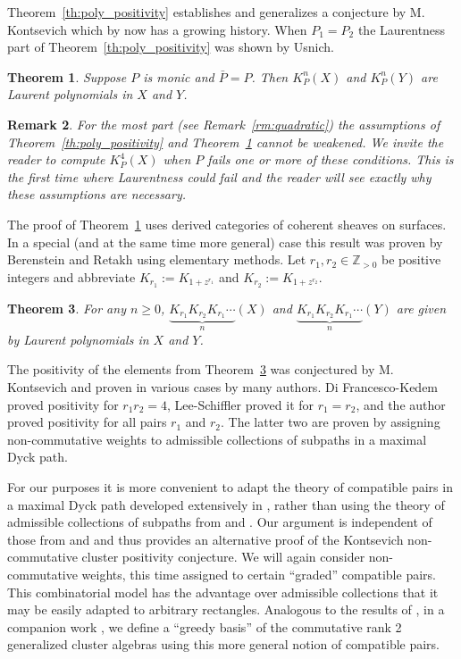 \documentclass{amsart}
\newtheorem{theorem}{Theorem}[section]
\newtheorem{remark}[theorem]{Remark}
\newcommand{\ZZ}{\mathbb{Z}}
\begin{document}
 Theorem~\ref{th:poly_positivity} establishes and generalizes a conjecture by M. Kontsevich which by now has a growing history.  When $P_1=P_2$ the Laurentness part of Theorem~\ref{th:poly_positivity} was shown by Usnich. 
 \begin{theorem}\cite{u}\label{th:laurent}
  Suppose $P$ is monic and $\bar{P}=P$.  Then $K_P^n(X)$ and $K_P^n(Y)$ are Laurent polynomials in $X$ and $Y$.
 \end{theorem}
 \begin{remark}
  For the most part (see Remark~\ref{rm:quadratic}) the assumptions of Theorem~\ref{th:poly_positivity} and Theorem~\ref{th:laurent} cannot be weakened.  We invite the reader to compute $K_P^4(X)$ when $P$ fails one or more of these conditions.  This is the first time where Laurentness could fail and the reader will see exactly why these assumptions are necessary. 
 \end{remark}
 The proof of Theorem~\ref{th:laurent} uses derived categories of coherent sheaves on surfaces.  In a special (and at the same time more general) case this result was proven by Berenstein and Retakh using elementary methods.  Let $r_1,r_2\in\ZZ_{>0}$ be positive integers and abbreviate $K_{r_1}:=K_{1+z^{r_1}}$ and $K_{r_2}:=K_{1+z^{r_2}}$.
 \begin{theorem}\cite{br}\label{th:easy_laurent}
  For any $n\ge0$, $\underbrace{K_{r_1}K_{r_2}K_{r_1}\cdots}_n(X)$ and $\underbrace{K_{r_1}K_{r_2}K_{r_1}\cdots}_n(Y)$ are given by Laurent polynomials in $X$ and $Y$.
 \end{theorem}

 The positivity of the elements from Theorem~\ref{th:easy_laurent} was conjectured by M. Kontsevich and proven in various cases by many authors.  Di Francesco-Kedem \cite{dk} proved positivity for $r_1r_2=4$, Lee-Schiffler \cite{ls} proved it for $r_1=r_2$, and the author \cite{r} proved positivity for all pairs $r_1$ and $r_2$.  The latter two are proven by assigning non-commutative weights to admissible collections of subpaths in a maximal Dyck path.  

 For our purposes it is more convenient to adapt the theory of compatible pairs in a maximal Dyck path developed extensively in \cite{llz}, rather than using the theory of admissible collections of subpaths from \cite{ls} and \cite{r}.  Our argument is independent of those from \cite{ls} and \cite{r} and thus provides an alternative proof of the Kontsevich non-commutative cluster positivity conjecture.  We will again consider non-commutative weights, this time assigned to certain ``graded'' compatible pairs.  This combinatorial model has the advantage over admissible collections that it may be easily adapted to arbitrary rectangles.  Analogous to the results of \cite{llz}, in a companion work \cite{r2}, we define a ``greedy basis'' of the commutative rank 2 generalized cluster algebras using this more general notion of compatible pairs.  
\end{document}
